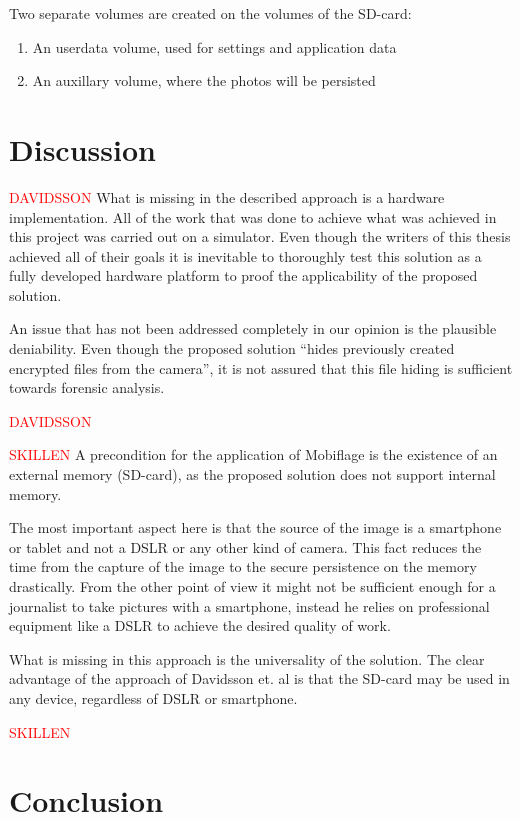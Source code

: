 \documentclass[12pt,a4paper,titlepage,oneside]{scrartcl}
\newcommand\todo[1]{\textcolor{red}{#1}}
\begin{document}
Two separate volumes are created on the volumes of the SD-card:
\begin{enumerate}
  \item An userdata volume, used for settings and application data
  \item An auxillary volume, where the photos will be persisted
\end{enumerate}


\newpage
\section{Discussion}

\todo{DAVIDSSON}
What is missing in the described approach is a hardware implementation.
All of the work that was done to achieve what was achieved in this project was carried out on a simulator.
Even though the writers of this thesis achieved all of their goals it is inevitable to thoroughly test this solution as a fully developed hardware platform to proof the applicability of the proposed solution.

An issue that has not been addressed completely in our opinion is the plausible deniability.
Even though the proposed solution ``hides previously created encrypted files from the camera'', it is not assured that this file hiding is sufficient towards forensic analysis.

\todo{DAVIDSSON}

\todo{SKILLEN}
A precondition for the application of Mobiflage is the existence of an external memory (SD-card), as the proposed solution does not support internal memory.

The most important aspect here is that the source of the image is a smartphone or tablet and not a DSLR or any other kind of camera.
This fact reduces the time from the capture of the image to the secure persistence on the memory drastically.
From the other point of view it might not be sufficient enough for a journalist to take pictures with a smartphone, instead he relies on professional equipment like a DSLR to achieve the desired quality of work.

What is missing in this approach is the universality of the solution.
The clear advantage of the approach of Davidsson et. al \cite{Davidsson2016} is that the SD-card may be used in any device, regardless of DSLR or smartphone.

\todo{SKILLEN}
\newpage
\section{Conclusion}
\newpage




\end{document}
